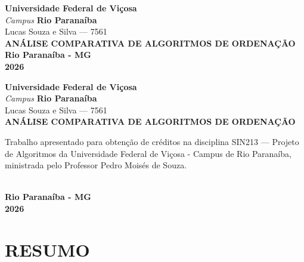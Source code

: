 \documentclass[12pt,arial]{article}
\author{Lucas Souza e Silva}
\begin{document}
	\begin{titlepage}
		\begin{center}
			\textbf{Universidade Federal de Viçosa}
			\textit{\\Campus}
			\textbf{Rio Paranaíba}
			\textnormal{\\\vspace{4cm}Lucas Souza e Silva --- 7561}
			\textbf{\\\vspace{5cm}ANÁLISE COMPARATIVA DE ALGORITMOS DE ORDENAÇÃO}
			\textbf{\\\vspace{9cm}Rio Paranaíba - MG \\ 2026}
		\end{center}
	\end{titlepage}
	
		\begin{titlepage}
			\begin{center}
				\textbf{Universidade Federal de Viçosa}
				\textit{\\Campus}
				\textbf{Rio Paranaíba}
				\textnormal{\\\vspace{3cm}Lucas Souza e Silva --- 7561}
				\textbf{\\\vspace{4cm}ANÁLISE COMPARATIVA DE ALGORITMOS DE ORDENAÇÃO\vspace{3cm}}
					\begin{flushright}
						\begin{minipage}{.5\textwidth}
							\textnormal{Trabalho apresentado para obtenção de créditos na disciplina SIN213 --- Projeto de Algoritmos da Universidade Federal de Viçosa - Campus de Rio Paranaíba, ministrada pelo Professor Pedro Moisés de Souza.}
						\end{minipage}
					\end{flushright}
					
				\textbf{\\\vspace{3cm}Rio Paranaíba - MG \\ 2026}
				
			\end{center}
		\end{titlepage}
		
		
		\section{RESUMO}
		
		\newpage
\end{document}
